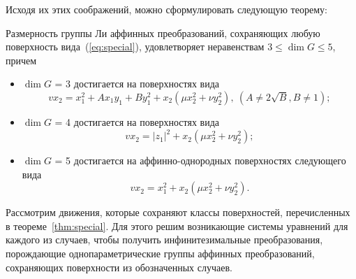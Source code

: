 \documentclass[../main.tex]{subfiles}
\begin{document}
Исходя их этих соображений, можно сформулировать следующую теорему:
\begin{theorem}\label{thm:special} Размерность группы Ли аффинных преобразований, сохраняющих любую поверхность вида~(\ref{eq:special}), удовлетворяет неравенствам
$3 \le \dim G \le 5$, причем
\begin{itemize}
	\item $\dim G$ = 3 достигается на поверхностях вида
	\begin{equation}\label{eq:special_3}
		v x_2 = x_1^2 + A x_1 y_1 + B y_1^2 + x_2 (\mu x_2^2 + \nu y_2^2),~(A \ne 2\sqrt{B}, B \ne 1);
	\end{equation}
	\item $\dim G$ = 4 достигается на поверхностях вида
	\begin{equation}\label{eq:special_4}
		v x_2 = |z_1|^2 + x_2 (\mu x_2^2 + \nu y_2^2);
	\end{equation}
		\item $\dim G$ = 5 достигается на аффинно-однородных поверхностях следующего вида
	\begin{equation}\label{eq:special_5}
		v x_2 = x_1^2 + x_2 (\mu x_2^2 + \nu y_2^2).
	\end{equation}
\end{itemize}
\end{theorem}

Рассмотрим движения, которые сохраняют классы поверхностей, перечисленных в теореме~\ref{thm:special}. Для этого решим возникающие системы уравнений для каждого из случаев, чтобы получить инфинитезимальные преобразования, порождающие однопараметрические группы аффинных преобразований, сохраняющих поверхности из обозначенных случаев.
\end{document}
